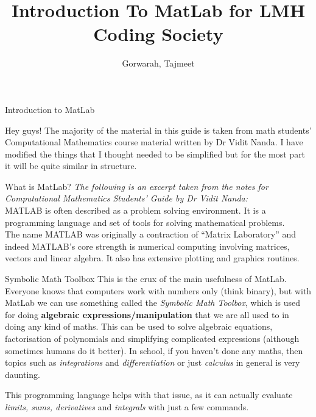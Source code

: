 \documentclass[11pt, oneside]{report}   	%
\title{Introduction To MatLab for LMH Coding Society}
\author{Gorwarah, Tajmeet}
\begin{document}
\maketitle
\begin{chapter}{Introduction to MatLab}

Hey guys! The majority of the material in this guide is taken from math students' Computational Mathematics course material written by Dr Vidit Nanda. I have modified the things that I thought needed to be simplified but for the most part it will be quite similar in structure.

\begin{section}{What is MatLab?}
\textit{The following is an excerpt taken from the notes for Computational Mathematics Students' Guide by Dr Vidit Nanda:}
\\

MATLAB is often described as a problem solving environment. It is a programming language and set of tools for solving mathematical problems.\\

The name MATLAB was originally a contraction of “Matrix Laboratory” and indeed MATLAB’s core strength is numerical computing involving matrices, vectors and linear algebra. It also has extensive plotting and graphics routines.

\begin{subsection}{Symbolic Math Toolbox}
This is the crux of the main usefulness of MatLab. Everyone knows that computers work with numbers only (think binary), but with MatLab we can use something called the
\textit{Symbolic Math Toolbox}, which is used for doing \textbf{algebraic expressions/manipulation} that we are all used to in doing any kind of maths. This can be used to
solve algebraic equations, factorisation of polynomials and simplifying complicated expressions (although sometimes humans do it better). In school, if you haven't done any
maths, then topics such as \textit{integrations} and \textit{differentiation} or just \textit{calculus} in general is very daunting. 

This programming language helps with that issue, as it can actually evaluate \textit{limits, sums, derivatives} and \textit{integrals} with just a few commands.


\end{subsection}
\end{section}
\end{chapter}
\end{document}
